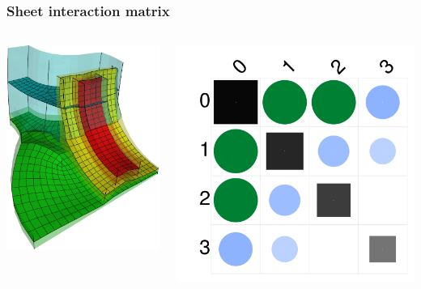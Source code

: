 \documentclass[12pt]{beamer}
\begin{document}
\begin{frame}
  \frametitle{Sheet interaction matrix}
  \begin{columns}
    \begin{column}{0.5\textwidth}
      \begin{center}
        \includegraphics[height=\textwidth]{./images/interaction.png}
      \end{center}
    \end{column}
    \begin{column}{0.5\textwidth}
      \includegraphics[width=\textwidth]{./images/matrix.png}

\end{column}
\end{columns}
\end{frame}
\end{document}
